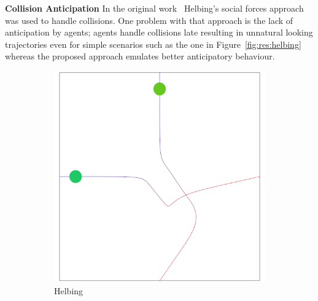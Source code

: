 

\textbf{Collision Anticipation}
In the original work~\cite{Yersin:2009} Helbing's social forces \cite{Helbing:2005} approach was used to handle collisions.
One problem with that approach is the lack of anticipation by agents; agents handle collisions late resulting in unnatural looking trajectories even for simple scenarios such as the one in Figure~\ref{fig:res:helbing} whereas the proposed approach emulates better anticipatory behaviour.

\begin{figure}[t]
	\centering
	\begin{subfigure}[b]{0.3\linewidth}
	 \centering
		\includegraphics[width=\linewidth]{images/res-helbing-crossing.png}
		\caption{Helbing}
	 \end{subfigure}
	\begin{subfigure}[b]{0.3\linewidth}
	 \centering

\end{subfigure}
\end{figure}
